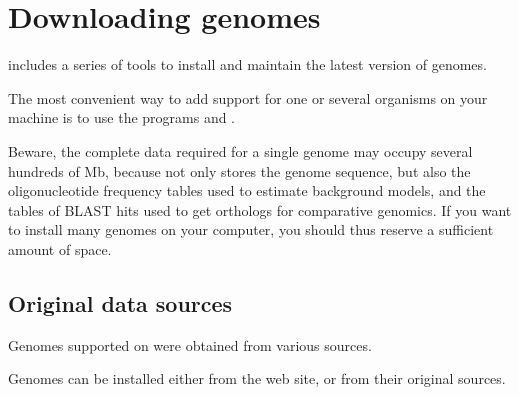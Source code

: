 
\chapter{Downloading genomes}
\label{downloading_genomes}

\RSAT includes a series of tools to install and maintain the latest
version of genomes.

The most convenient way to add support for one or several organisms on
your machine is to use the programs  and
.

Beware, the complete data required for a single genome may occupy
several hundreds of Mb, because \RSAT not only stores the genome
sequence, but also the oligonucleotide frequency tables used to
estimate background models, and the tables of BLAST hits used to get
orthologs for comparative genomics. If you want to install many
genomes on your computer, you should thus reserve a sufficient amount
of space.

\section{Original data sources}

Genomes supported on \RSAT were obtained from various sources.

Genomes can be installed either from the \RSAT web site, or from their
original sources.  

